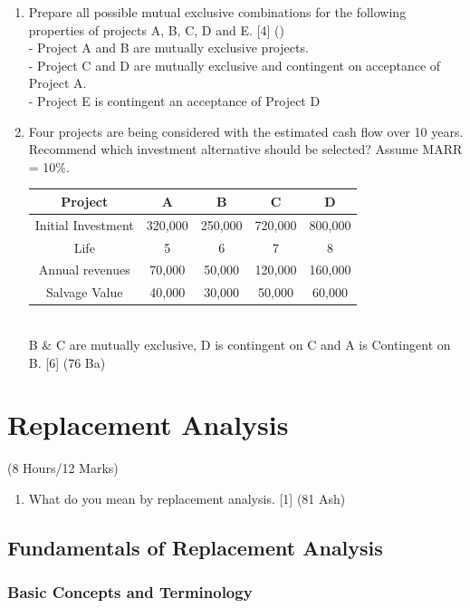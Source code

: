 \documentclass[12pt]{article}
\begin{document}
\begin{enumerate}[noitemsep, topsep = 0pt]
		\item Prepare all possible mutual exclusive combinations for the following properties of projects A, B, C, D and E. \hfill [4] ()\\
		- Project A and B are mutually exclusive projects.\\
		- Project C and D are mutually exclusive and contingent on acceptance of Project A.\\
		- Project E is contingent an acceptance of Project D 
		
		\item Four projects are being considered with the estimated cash flow over 10 years. Recommend which investment alternative should be selected? Assume MARR = 10\%. \\
		\begin{tabular}{|c|c|c|c|c|}
			\hline
			Project & A & B & C & D \\ \hline
			Initial Investment & 320,000 & 250,000 & 720,000 & 800,000 \\ \hline
			Life & 5 & 6 & 7 & 8 \\ \hline
			Annual revenues & 70,000 & 50,000 & 120,000 & 160,000 \\ \hline
			Salvage Value & 40,000 & 30,000 & 50,000 & 60,000 \\ \hline
		\end{tabular}\\
		B \& C are mutually exclusive, D is contingent on C and A is Contingent on B. \hfill [6] (76 Ba)
	\end{enumerate}

	\pagebreak
\section{Replacement Analysis}
	\begin{center}(8 Hours/12 Marks)\end{center}
	\begin{enumerate}[noitemsep, topsep = 0pt]
		\item What do you mean by replacement analysis. \hfill [1] (81 Ash)
	\end{enumerate}
	\subsection{Fundamentals of Replacement Analysis}
	\subsubsection{Basic Concepts and Terminology}
\end{document}
